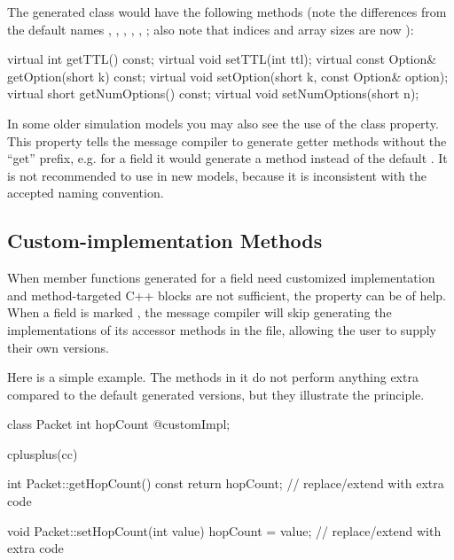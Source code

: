 The generated class would have the following methods (note the differences
from the default names , , ,
, , ;
also note that indices and array sizes are now ):

\begin{cpp}
virtual int getTTL() const;
virtual void setTTL(int ttl);
virtual const Option& getOption(short k) const;
virtual void setOption(short k, const Option& option);
virtual short getNumOptions() const;
virtual void setNumOptions(short n);
\end{cpp}

In some older simulation models you may also see the use of the
 class property. This property tells the message
compiler to generate getter methods without the ``get'' prefix, e.g. for a
 field it would generate a  method
instead of the default . It is not recommended to
use  in new models, because it is inconsistent with the
accepted naming convention.



\subsection{Custom-implementation Methods}
\label{sec:msg-defs:customimpl-fields}

When member functions generated for a field need customized implementation and
method-targeted C++ blocks are not sufficient, the  property
can be of help. When a field is marked , the message compiler
will skip generating the implementations of its accessor methods in the  file,
allowing the user to supply their own versions.

Here is a simple example. The methods in it do not perform anything extra
compared to the default generated versions, but they illustrate the principle.

\begin{msg}
class Packet
{
    int hopCount @customImpl;
}

cplusplus(cc) {{
int Packet::getHopCount() const
{
    return hopCount; // replace/extend with extra code
}

void Packet::setHopCount(int value)
{
    hopCount = value; // replace/extend with extra code
}
}}
\end{msg}



